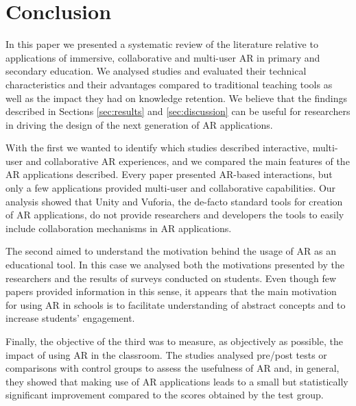 \section{Conclusion} \label{sec:conclusion}
In this paper we presented a systematic review of the literature relative to applications of immersive, collaborative and multi-user \gls{AR} in primary and secondary education. We analysed \papersSelected studies and evaluated their technical characteristics and their advantages compared to traditional teaching tools as well as the impact they had on knowledge retention. We believe that the findings described in Sections \ref{sec:results} and \ref{sec:discussion} can be useful for researchers in driving the design of the next generation of AR applications.

With the first  we wanted to identify which studies described interactive, multi-user and collaborative AR experiences, and we compared the main features of the AR applications described. Every paper presented AR-based interactions, but only a few applications provided multi-user and collaborative capabilities. Our analysis showed that Unity and Vuforia, the de-facto standard tools for creation of \gls{AR} applications, do not provide researchers and developers the tools to easily include collaboration mechanisms in \gls{AR} applications.

The second  aimed to understand the motivation behind the usage of \gls{AR} as an educational tool. In this case we analysed both the motivations presented by the researchers and the results of surveys conducted on students. Even though few papers provided information in this sense, it appears that the main motivation for using \gls{AR} in schools is to facilitate understanding of abstract concepts and to increase students' engagement.

Finally, the objective of the third  was to measure, as objectively as possible, the impact of using \gls{AR} in the classroom. The studies analysed pre/post tests or comparisons with control groups to assess the usefulness of \gls{AR} and, in general, they showed that making use of \gls{AR} applications leads to a small but statistically significant improvement compared to the scores obtained by the test group.   

